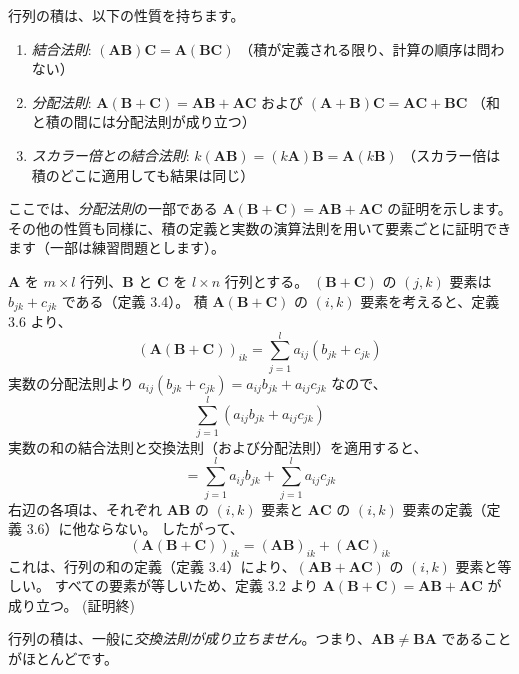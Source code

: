\begin{thm}[行列の積の性質]
行列の積は、以下の性質を持ちます。
\begin{enumerate}
\item \emph{結合法則}: $(\bm{A}\bm{B})\bm{C} = \bm{A}(\bm{B}\bm{C})$
    （積が定義される限り、計算の順序は問わない）
\item \emph{分配法則}: $\bm{A}(\bm{B} + \bm{C}) = \bm{A}\bm{B} + \bm{A}\bm{C}$ および $(\bm{A} + \bm{B})\bm{C} = \bm{A}\bm{C} + \bm{B}\bm{C}$
    （和と積の間には分配法則が成り立つ）
\item \emph{スカラー倍との結合法則}: $k(\bm{A}\bm{B}) = (k\bm{A})\bm{B} = \bm{A}(k\bm{B})$
    （スカラー倍は積のどこに適用しても結果は同じ）
\end{enumerate}
\begin{proof*}
ここでは、\emph{分配法則}の一部である $\bm{A}(\bm{B} + \bm{C}) = \bm{A}\bm{B} + \bm{A}\bm{C}$ の証明を示します。その他の性質も同様に、積の定義と実数の演算法則を用いて要素ごとに証明できます（一部は練習問題とします）。\par
$\bm{A}$ を $m \times l$ 行列、$\bm{B}$ と $\bm{C}$ を $l \times n$ 行列とする。
$(\bm{B} + \bm{C})$ の $(j,k)$ 要素は $b_{jk} + c_{jk}$ である（定義 3.4）。
積 $\bm{A}(\bm{B} + \bm{C})$ の $(i,k)$ 要素を考えると、定義 3.6 より、
$$(\bm{A}(\bm{B} + \bm{C}))_{ik} = \sum_{j=1}^{l} a_{ij}(b_{jk} + c_{jk})$$実数の分配法則より $a_{ij}(b_{jk} + c_{jk}) = a_{ij}b_{jk} + a_{ij}c_{jk}$ なので、$$\sum_{j=1}^{l} (a_{ij}b_{jk} + a_{ij}c_{jk})$$実数の和の結合法則と交換法則（および分配法則）を適用すると、$$= \sum_{j=1}^{l} a_{ij}b_{jk} + \sum_{j=1}^{l} a_{ij}c_{jk}$$
右辺の各項は、それぞれ $\bm{A}\bm{B}$ の $(i,k)$ 要素と $\bm{A}\bm{C}$ の $(i,k)$ 要素の定義（定義 3.6）に他ならない。
したがって、
$$(\bm{A}(\bm{B} + \bm{C}))_{ik} = (\bm{A}\bm{B})_{ik} + (\bm{A}\bm{C})_{ik}$$
これは、行列の和の定義（定義 3.4）により、$(\bm{A}\bm{B} + \bm{A}\bm{C})$ の $(i,k)$ 要素と等しい。
すべての要素が等しいため、定義 3.2 より $\bm{A}(\bm{B} + \bm{C}) = \bm{A}\bm{B} + \bm{A}\bm{C}$ が成り立つ。
(証明終)
\end{proof*}
\end{thm}
\begin{rmk*}
行列の積は、一般に\emph{交換法則が成り立ちません}。つまり、$\bm{A}\bm{B} \neq \bm{B}\bm{A}$ であることがほとんどです。
\end{rmk*}
